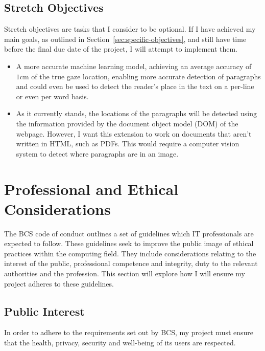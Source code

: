 \documentclass{report}
\begin{document}
\section{Stretch Objectives}\label{sec:stretch-objectives}

Stretch objectives are tasks that I consider to be optional. If I have achieved my main goals, as outlined in Section~\ref{sec:specific-objectives}, and still have time before the final due date of the project, I will attempt to implement them.

\begin{itemize}
    \item A more accurate machine learning model, achieving an average accuracy of \(1\text{cm}\) of the true gaze location, enabling more accurate detection of paragraphs and could even be used to detect the reader's place in the text on a per-line or even per word basis.

    \item As it currently stands, the locations of the paragraphs will be detected using the information provided by the document object model (DOM) of the webpage. However, I want this extension to work on documents that aren't written in HTML, such as PDFs. This would require a computer vision system to detect where paragraphs are in an image.
\end{itemize}

\chapter{Professional and Ethical Considerations}
\label{chap:ethics}

\noindent
The BCS code of conduct \cite{bcs2022coc} outlines a set of guidelines which IT professionals are expected to follow. These guidelines seek to improve the public image of ethical practices within the computing field. They include considerations relating to the interest of the public, professional competence and integrity, duty to the relevant authorities and the profession. This section will explore how I will ensure my project adheres to these guidelines. 

\section{Public Interest}   

In order to adhere to the requirements set out by BCS, my project must ensure that the health, privacy, security and well-being of its users are respected. 
\end{document}
